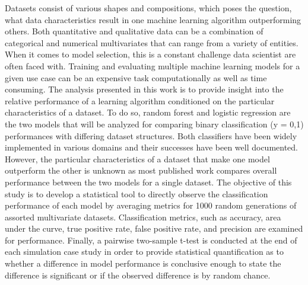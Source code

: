 \documentclass{llncs}
\begin{document}
Datasets consist of various shapes and compositions, which poses the question, what data characteristics result in one machine learning algorithm outperforming others. Both quantitative and qualitative data can be a combination of categorical and numerical multivariates that can range from a variety of entities. When it comes to model selection, this is a constant challenge data scientist are often faced with. Training and evaluating multiple machine learning models for a given use case can be an expensive task computationally as well as time consuming. The analysis presented in this work is to provide insight into the relative performance of a learning algorithm conditioned on the particular characteristics of a dataset. To do so, random forest and logistic regression are the two models that will be analyzed for comparing binary classification (y = {0,1}) performances with differing dataset structures. Both classifiers have been widely implemented in various domains and their successes have been well documented. However, the particular characteristics of a dataset that make one model outperform the other is unknown as most published work compares overall performance between the two models for a single dataset. The objective of this study is to develop a statistical tool to directly observe the classification performance of each model by averaging metrics for 1000 random generations of assorted multivariate datasets. Classification metrics, such as accuracy, area under the curve, true positive rate, false positive rate, and precision are examined for performance. Finally, a pairwise two-sample t-test is conducted at the end of each simulation case study in order to provide statistical quantification as to whether a difference in model performance is conclusive enough to state the difference is significant or if the observed difference is by random chance. 
\end{document}
